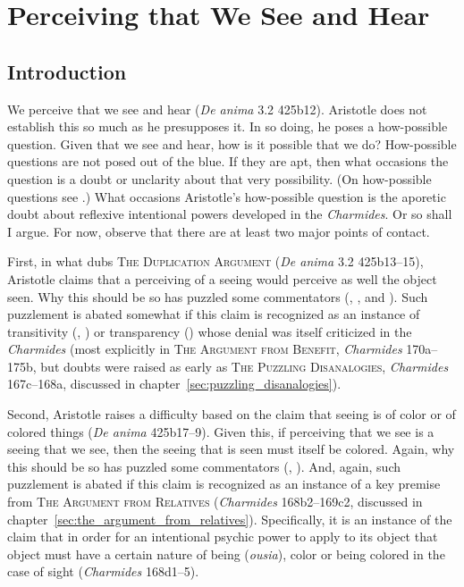 \chapter{Perceiving that We See and Hear} %
\label{cha:perceiving}


\section{Introduction} %
\label{sec:introduction2}

We perceive that we see and hear (\emph{De anima} 3.2 425b12). Aristotle does not establish this so much as he presupposes it. In so doing, he poses a how-possible question. Given that we see and hear, how is it possible that we do? How-possible questions are not posed out of the blue. If they are apt, then what occasions the question is a doubt or unclarity about that very possibility. (On how-possible questions see \citealt{Cassam:2007lq}.) What occasions Aristotle's how-possible question is the aporetic doubt about reflexive intentional powers developed in the \emph{Charmides}. Or so shall I argue. For now, observe that there are at least two major points of contact.

First, in what \citet{caston02} dubs \textsc{The Duplication Argument} (\emph{De anima} 3.2 425b13–15), Aristotle claims that a perceiving of a seeing would perceive as well the object seen. Why this should be so has puzzled some commentators (\citealt[435]{Hicks:1907uq}, \citealt[121–2]{Hamlyn:2002ys}, and \citealt[44–5]{Kosman:2014ab}). Such puzzlement is abated somewhat if this claim is recognized as an instance of transitivity (\citealt{McCabe:2007ss}, \citealt{McCabe:2007jb}) or transparency (\citealt{Tsouna:2022aa}) whose denial was itself criticized in the \emph{Charmides} (most explicitly in \textsc{The Argument from Benefit}, \emph{Charmides} 170a–175b, but doubts were raised as early as \textsc{The Puzzling Disanalogies}, \emph{Charmides} 167c–168a, discussed in chapter~\ref{sec:puzzling_disanalogies}).

Second, Aristotle raises a difficulty based on the claim that seeing is of color or of colored things (\emph{De anima} 425b17–9). Given this, if perceiving that we see is a seeing that we see, then the seeing that is seen must itself be colored. Again, why this should be so has puzzled some commentators (\citealt[122]{Hamlyn:2002ys}, \citealt[45–6]{Kosman:2014ab}). And, again, such puzzlement is abated if this claim is recognized as an instance of a key premise from \textsc{The Argument from Relatives} (\emph{Charmides} 168b2–169c2, discussed in chapter~\ref{sec:the_argument_from_relatives}). Specifically, it is an instance of the claim that in order for an intentional psychic power to apply to its object that object must have a certain nature of being (\emph{ousia}), color or being colored in the case of sight (\emph{Charmides} 168d1–5).

